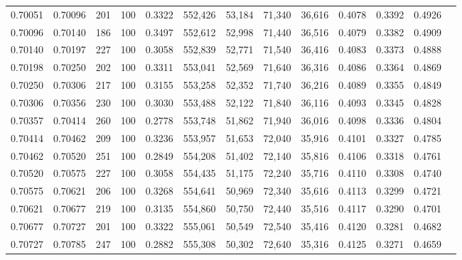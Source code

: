 \begin{tabular}{rrrrrrrrrrrrr}
0.70051 & 0.70096 &   201 & 100 &                                     0.3322 & 552,426 &  53,184 &  71,340 &  36,616 & 0.4078 & 0.3392 & 0.4926 \\
0.70096 & 0.70140 &   186 & 100 &                                     0.3497 & 552,612 &  52,998 &  71,440 &  36,516 & 0.4079 & 0.3382 & 0.4909 \\
0.70140 & 0.70197 &   227 & 100 &                                     0.3058 & 552,839 &  52,771 &  71,540 &  36,416 & 0.4083 & 0.3373 & 0.4888 \\
0.70198 & 0.70250 &   202 & 100 &                                     0.3311 & 553,041 &  52,569 &  71,640 &  36,316 & 0.4086 & 0.3364 & 0.4869 \\
0.70250 & 0.70306 &   217 & 100 &                                     0.3155 & 553,258 &  52,352 &  71,740 &  36,216 & 0.4089 & 0.3355 & 0.4849 \\
0.70306 & 0.70356 &   230 & 100 &                                     0.3030 & 553,488 &  52,122 &  71,840 &  36,116 & 0.4093 & 0.3345 & 0.4828 \\
0.70357 & 0.70414 &   260 & 100 &                                     0.2778 & 553,748 &  51,862 &  71,940 &  36,016 & 0.4098 & 0.3336 & 0.4804 \\
0.70414 & 0.70462 &   209 & 100 &                                     0.3236 & 553,957 &  51,653 &  72,040 &  35,916 & 0.4101 & 0.3327 & 0.4785 \\
0.70462 & 0.70520 &   251 & 100 &                                     0.2849 & 554,208 &  51,402 &  72,140 &  35,816 & 0.4106 & 0.3318 & 0.4761 \\
0.70520 & 0.70575 &   227 & 100 &                                     0.3058 & 554,435 &  51,175 &  72,240 &  35,716 & 0.4110 & 0.3308 & 0.4740 \\
0.70575 & 0.70621 &   206 & 100 &                                     0.3268 & 554,641 &  50,969 &  72,340 &  35,616 & 0.4113 & 0.3299 & 0.4721 \\
0.70621 & 0.70677 &   219 & 100 &                                     0.3135 & 554,860 &  50,750 &  72,440 &  35,516 & 0.4117 & 0.3290 & 0.4701 \\
0.70677 & 0.70727 &   201 & 100 &                                     0.3322 & 555,061 &  50,549 &  72,540 &  35,416 & 0.4120 & 0.3281 & 0.4682 \\
0.70727 & 0.70785 &   247 & 100 &                                     0.2882 & 555,308 &  50,302 &  72,640 &  35,316 & 0.4125 & 0.3271 & 0.4659 \\

\end{tabular}
